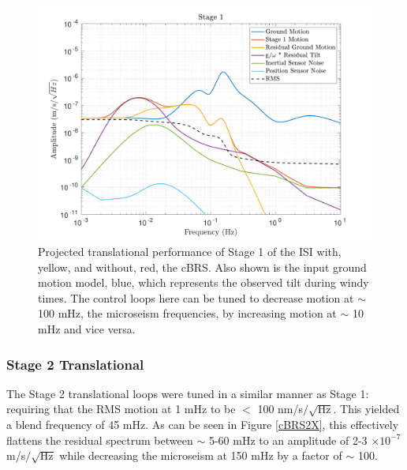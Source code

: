 \documentclass [12pt, proquest]{uwthesis}[2019]
\begin{document}
\begin{figure}[!h]
\begin{center}
\includegraphics[width=\textwidth]{cBRS_Model_ST1X.pdf}
\caption[Projected translational performance of Stage 1 of the ISI]{Projected translational performance of Stage 1 of the ISI with, yellow, and without, red, the cBRS. Also shown is the input ground motion model, blue, which represents the observed tilt during windy times. The control loops here can be tuned to decrease motion at $\sim$ 100 mHz, the microseism frequencies, by increasing motion at $\sim$ 10 mHz and vice versa.}
\label{cBRS1X}
\end{center}
\end{figure}

\subsubsection{Stage 2 Translational}

The Stage 2 translational loops were tuned in a similar manner as Stage 1: requiring that the RMS motion at 1 mHz to be $<$ 100 nm/s$/\sqrt{\text{Hz}}$. This yielded  a blend frequency of 45 mHz. As can be seen in Figure \ref{cBRS2X}, this effectively flattens the residual spectrum between $\sim$ 5-60 mHz to an amplitude of 2-3 $\times 10^{-7}$ m/s$/\sqrt{\text{Hz}}$ while decreasing the microseism at 150 mHz by a factor of $\sim$ 100.
\end{document}
